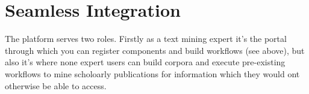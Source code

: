 \section{Seamless Integration}

The platform serves two roles. Firstly as a text mining expert it's the portal through which you can register components and build workflows (see above), but also it's where none expert users can build corpora and execute pre-existing workflows to mine scholoarly publications for information which they would ont otherwise be able to access.
